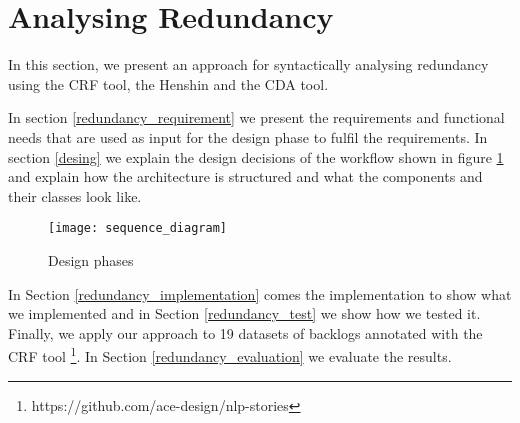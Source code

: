 \section{Analysing Redundancy}\label{redundancy}
In this section, we present an approach for syntactically analysing redundancy using the CRF tool, the Henshin and the CDA tool.

In section \ref{redundancy_requirement} we present the requirements and functional needs that are used as input for the design phase to fulfil the requirements. In section \ref{desing} we explain the design decisions of the workflow shown in figure \ref{fig:design_phases} and explain how the architecture is structured and what the components and their classes look like. 
\begin{figure}[h]
	\centering 
	\texttt{[image: sequence\_diagram]}
	\caption{Design phases}\label{fig:design_phases}
\end{figure} 

In Section \ref{redundancy_implementation} comes the implementation to show what we implemented and in Section \ref{redundancy_test} we show how we tested it. Finally, we apply our approach to 19 datasets of backlogs annotated with the CRF tool \footnote {https://github.com/ace-design/nlp-stories}. In Section \ref{redundancy_evaluation} we evaluate the results.

